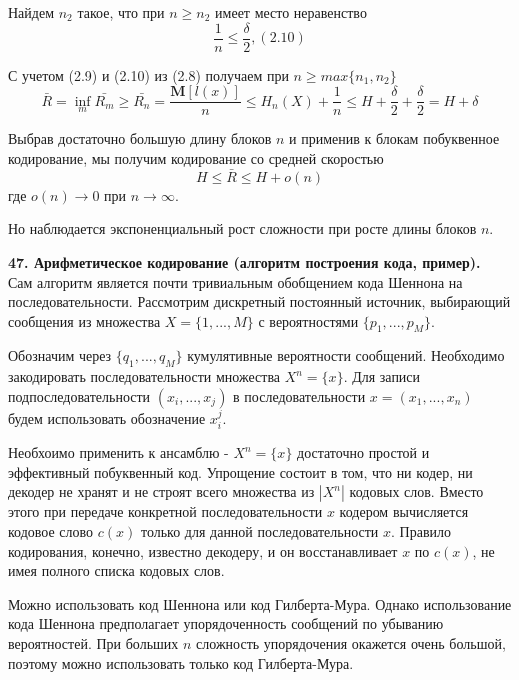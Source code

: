 \documentclass[14pt]{article}
\begin{document}
Найдем \(n_2\) такое, что при \(n \geq n_2\) имеет место неравенство
\begin{displaymath}
    \frac{1}{n} \leq \frac{\delta}{2}, (2.10)
\end{displaymath}

С учетом (2.9) и (2.10) из (2.8) получаем при \(n \geq max\{n_1, n_2\}\)
\begin{displaymath}
    \bar{R} = \inf_{m}\bar{R_m} \geq \bar{R_n} = \frac{\textbf{M}[l(x)]}{n} \leq H_n(X) + \frac{1}{n} \leq H + \frac{\delta}{2} + \frac{\delta}{2} = H + \delta
\end{displaymath}

Выбрав достаточно большую длину блоков \(n\) и применив к блокам побуквенное кодирование, мы получим кодирование со средней скоростью
\begin{displaymath}
    H \leq \bar{R} \leq H + o(n)
\end{displaymath}
где \(o(n) \to 0\) при \(n \to \infty\).

Но наблюдается экспоненциальный рост сложности при росте длины блоков \(n\).

\bigskip
\textbf{47. Арифметическое кодирование (алгоритм построения кода, пример).} \\

Сам алгоритм является почти тривиальным обобщением кода Шеннона на последовательности. Рассмотрим дискретный постоянный источник, выбирающий сообщения из множества \(X = \{1,...,M\}\) с вероятностями \(\{p_1,...,p_M\}\).

Обозначим через \(\{q_1,...,q_M\}\) кумулятивные вероятности сообщений. Необходимо закодировать последовательности множества \(X^n = \{x\}\). Для записи подпоследовательности \((x_i,...,x_j)\) в последовательности \(x = (x_1,...,x_n)\) будем использовать обозначение \(x_i^j\).

Необхоимо применить к ансамблю - \(X^n = \{x\}\) достаточно простой и эффективный побуквенный код. Упрощение состоит в том, что ни кодер, ни декодер не хранят и не строят всего множества из \(|X^n|\) кодовых слов. Вместо этого при передаче конкретной последовательности \(x\) кодером вычисляется кодовое слово \(c(x)\) только для данной последовательности \(x\). Правило кодирования, конечно, известно декодеру, и он восстанавливает \(x\) по \(c(x)\), не имея полного списка кодовых слов.

Можно использовать код Шеннона или код Гилберта-Мура. Однако использование кода Шеннона предполагает упорядоченность сообщений по убыванию вероятностей. При больших \(n\) сложность упорядочения окажется очень большой, поэтому можно использовать только код Гилберта-Мура.
\end{document}
